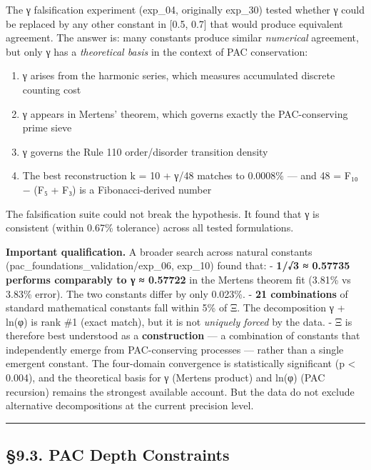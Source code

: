 \documentclass[
  11pt,
  a4paper]{article}
\providecommand{\tightlist}{%
  \setlength{\itemsep}{0pt}\setlength{\parskip}{0pt}}
\begin{document}
The γ falsification experiment (exp\_04, originally exp\_30) tested
whether γ could be replaced by any other constant in {[}0.5, 0.7{]} that
would produce equivalent agreement. The answer is: many constants
produce similar \emph{numerical} agreement, but only γ has a
\emph{theoretical basis} in the context of PAC conservation:

\begin{enumerate}
\def\labelenumi{\arabic{enumi}.}
\tightlist
\item
  γ arises from the harmonic series, which measures accumulated discrete
  counting cost
\item
  γ appears in Mertens' theorem, which governs exactly the
  PAC-conserving prime sieve
\item
  γ governs the Rule 110 order/disorder transition density
\item
  The best reconstruction k = 10 + γ/48 matches to 0.0008\% --- and 48 =
  F₁₀ − (F₅ + F₃) is a Fibonacci-derived number
\end{enumerate}

The falsification suite could not break the hypothesis. It found that γ
is consistent (within 0.67\% tolerance) across all tested formulations.

\textbf{Important qualification.} A broader search across natural
constants (pac\_foundations\_validation/exp\_06, exp\_10) found that: -
\textbf{1/√3 ≈ 0.57735 performs comparably to γ ≈ 0.57722} in the
Mertens theorem fit (3.81\% vs 3.83\% error). The two constants differ
by only 0.023\%. - \textbf{21 combinations} of standard mathematical
constants fall within 5\% of Ξ. The decomposition γ + ln(φ) is rank \#1
(exact match), but it is not \emph{uniquely forced} by the data. - Ξ is
therefore best understood as a \textbf{construction} --- a combination
of constants that independently emerge from PAC-conserving processes ---
rather than a single emergent constant. The four-domain convergence is
statistically significant (p \textless{} 0.004), and the theoretical
basis for γ (Mertens product) and ln(φ) (PAC recursion) remains the
strongest available account. But the data do not exclude alternative
decompositions at the current precision level.

\begin{center}\rule{0.5\linewidth}{0.5pt}\end{center}

\subsection{§9.3. PAC Depth Constraints}\label{pac-depth-constraints}
\end{document}

